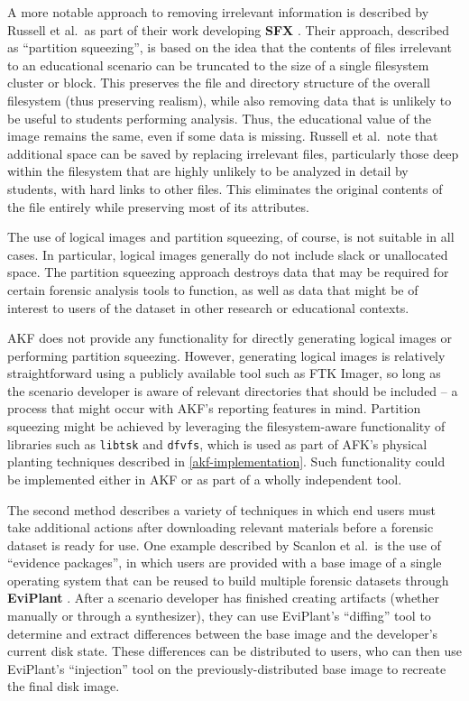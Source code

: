 A more notable approach to removing irrelevant information is described
by Russell et al.~as part of their work developing \textbf{SFX}
\cite{russellForensicImageDescription2012}. Their approach,
described as ``partition squeezing'', is based on the idea that the
contents of files irrelevant to an educational scenario can be truncated
to the size of a single filesystem cluster or block. This preserves the
file and directory structure of the overall filesystem (thus preserving
realism), while also removing data that is unlikely to be useful to
students performing analysis. Thus, the educational value of the image
remains the same, even if some data is missing. Russell et al.~note that
additional space can be saved by replacing irrelevant files,
particularly those deep within the filesystem that are highly unlikely
to be analyzed in detail by students, with hard links to other files.
This eliminates the original contents of the file entirely while
preserving most of its attributes.

The use of logical images and partition squeezing, of course, is not
suitable in all cases. In particular, logical images generally do not
include slack or unallocated space. The partition squeezing approach
destroys data that may be required for certain forensic analysis tools
to function, as well as data that might be of interest to users of the
dataset in other research or educational contexts.

AKF does not provide any functionality for directly generating logical
images or performing partition squeezing. However, generating logical
images is relatively straightforward using a publicly available tool
such as FTK Imager, so long as the scenario developer is aware of
relevant directories that should be included -- a process that might
occur with AKF's reporting features in mind. Partition squeezing might
be achieved by leveraging the filesystem-aware functionality of
libraries such as \passthrough{\lstinline!libtsk!} and
\passthrough{\lstinline!dfvfs!}, which is used as part of AFK's physical
planting techniques described in \autoref{akf-implementation}. Such functionality could be implemented either in
AKF or as part of a wholly independent tool.

The second method describes a variety of techniques in which end users
must take additional actions after downloading relevant materials before
a forensic dataset is ready for use. One example described by Scanlon et
al.~is the use of ``evidence packages'', in which users are provided
with a base image of a single operating system that can be reused to
build multiple forensic datasets through \textbf{EviPlant}
\cite{scanlonEviPlantEfficientDigital2017}. After a scenario
developer has finished creating artifacts (whether manually or through a
synthesizer), they can use EviPlant's ``diffing'' tool to determine and
extract differences between the base image and the developer's current
disk state. These differences can be distributed to users, who can then
use EviPlant's ``injection'' tool on the previously-distributed base
image to recreate the final disk image.

